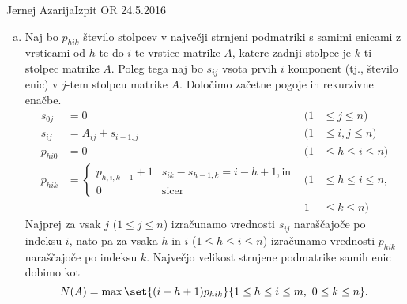 \begin{naloga}{Jernej Azarija}{Izpit OR 24.5.2016}
\begin{odgovor}
\begin{enumerate}[(a)]
\item Naj bo $p_{hik}$ število stolpcev
v največji strnjeni podmatriki s samimi enicami
z vrsticami od $h$-te do $i$-te vrstice matrike $A$,
katere zadnji stolpec je $k$-ti stolpec matrike $A$.
Poleg tega naj bo $s_{ij}$ vsota prvih $i$ komponent (tj., število enic)
v $j$-tem stolpcu matrike $A$.
Določimo začetne pogoje in rekurzivne enačbe.
\begin{align*}
s_{0j}  &= 0 & (1 &\le j \le n) \\
s_{ij}  &= A_{ij} + s_{i-1,j} & (1 &\le i, j \le n) \\
p_{hi0} &= 0 & (1 &\le h \le i \le n) \\
p_{hik} &= \begin{cases}
p_{h,i,k-1} + 1 & s_{ik} - s_{h-1,k} = i-h+1, \text{in} \\
0 & \text{sicer}
\end{cases} &
(1 &\le h \le i \le n, \\[-5mm]
&& 1 &\le k \le n)
\end{align*}
Najprej za vsak $j$ ($1 \le j \le n$)
izračunamo vrednosti $s_{ij}$ naraščajoče po indeksu $i$,
nato pa za vsaka $h$ in $i$ ($1 \le h \le i \le n$)
izračunamo vrednosti $p_{hik}$ naraščajoče po indeksu $k$.
Največjo velikost strnjene podmatrike samih enic dobimo kot
$$
N(A) = \max\set{(i-h+1) p_{hik}}{1 \le h \le i \le m, \ 0 \le k \le n} .
$$


\end{enumerate}
\end{odgovor}
\end{naloga}
